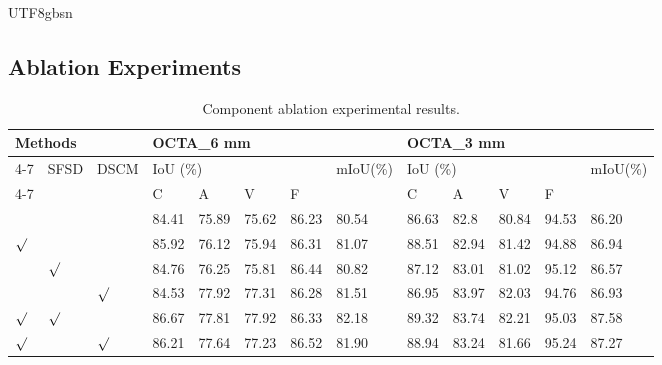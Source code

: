 \documentclass[times, review, 10pt]{elsarticle}
\begin{document}
\begin{CJK}{UTF8}{gbsn}
\subsection{Ablation Experiments}




\begin{table}[tbp]
\centering
\caption{Component ablation experimental results.}
\label{tab4}
\renewcommand{\arraystretch}{1} %
\setlength{\tabcolsep}{1.8pt}
\small
\begin{tabular}{lllllllllllll} 
\toprule
\multicolumn{3}{l}{Methods}                                           & \multicolumn{5}{l}{OCTA\_6 mm}                            & \multicolumn{5}{l}{OCTA\_3 mm}                             \\ 
\cline{4-7}\cline{9-12}
\multirow{2}{*}{CCPM} & \multirow{2}{*}{SFSD} & \multirow{2}{*}{DSCM} & \multicolumn{4}{l}{IoU (\%)}  & \multirow{2}{*}{mIoU(\%)} & \multicolumn{4}{l}{IoU (\%)}  & \multirow{2}{*}{mIoU(\%)}  \\ 
\cline{4-7}\cline{9-12}
                      &                       &                       & C     & A     & V     & F     &                           & C     & A     & V     & F     &                            \\ 
\hline
~                     & ~                     & ~                     & 84.41 & 75.89 & 75.62 & 86.23 & 80.54                     & 86.63 & 82.8  & 80.84 & 94.53 & 86.20\textbf{}             \\
$\surd$                     & ~                     & ~                     & 85.92 & 76.12 & 75.94 & 86.31 & 81.07                     & 88.51 & 82.94 & 81.42 & 94.88 & 86.94\textbf{}             \\
~                     & $\surd$                     & ~                     & 84.76 & 76.25 & 75.81 & 86.44 & 80.82                     & 87.12 & 83.01 & 81.02 & 95.12 & 86.57\textbf{}             \\
~                     & ~                     & $\surd$                     & 84.53 & 77.92 & 77.31 & 86.28 & 81.51                     & 86.95 & 83.97 & 82.03 & 94.76 & 86.93\textbf{}             \\
$\surd$                     & $\surd$                     & ~                     & 86.67 & 77.81 & 77.92 & 86.33 & 82.18                     & 89.32 & 83.74 & 82.21 & 95.03 & 87.58\textbf{}             \\
$\surd$                     & ~                     & $\surd$                     & 86.21 & 77.64 & 77.23 & 86.52 & 81.90                     & 88.94 & 83.24 & 81.66 & 95.24 & 87.27\textbf{}             \\

\end{tabular}
\end{table}
\end{CJK}
\end{document}
